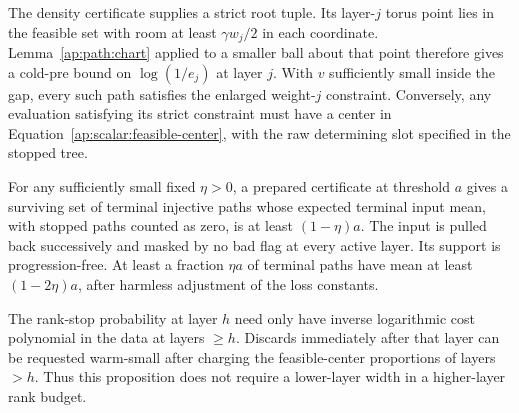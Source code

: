 The density certificate supplies a strict root tuple. Its layer-$j$
torus point lies in the feasible set with room at least
$\gamma w_j/2$ in each coordinate.
Lemma~\ref{ap:path:chart} applied to a smaller ball about that point
therefore gives a cold-pre bound on $\log(1/e_j)$ at layer $j$.
With $v$ sufficiently small inside the gap, every such path satisfies the enlarged
weight-$j$ constraint. Conversely, any evaluation satisfying its
strict constraint must have a center in
Equation~\eqref{ap:scalar:feasible-center}, with the raw determining
slot specified in the stopped tree.

\begin{proposition}\label{ap:scalar:forward}
For any sufficiently small fixed $\eta>0$, a prepared certificate at
threshold $a$ gives a surviving set of terminal injective paths whose
expected terminal input mean, with stopped paths counted as zero, is
at least $(1-\eta)a$. The input is pulled back successively and masked
by no bad flag at every active layer. Its support is progression-free.
At least a fraction $\eta a$ of terminal paths have mean at least
$(1-2\eta)a$, after harmless adjustment of the loss constants.

The rank-stop probability at layer $h$ need only have inverse
logarithmic cost polynomial in the data at layers $\ge h$. Discards
immediately after that layer can be requested warm-small after
charging the feasible-center proportions of layers $>h$. Thus this
proposition does not require a lower-layer width in a higher-layer
rank budget.
\end{proposition}

